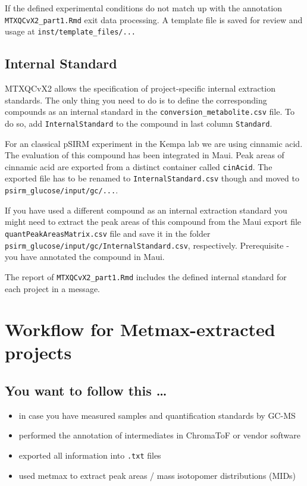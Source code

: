 \documentclass[]{book}
\providecommand{\tightlist}{%
  \setlength{\itemsep}{0pt}\setlength{\parskip}{0pt}}
\theoremstyle{definition}
\theoremstyle{definition}
\theoremstyle{definition}
\theoremstyle{remark}
\begin{document}
If the defined experimental conditions do not match up with the
annotation \texttt{MTXQCvX2\_part1.Rmd} exit data processing. A template
file is saved for review and usage at \texttt{inst/template\_files/...}

\section{Internal Standard}\label{internal-standard}

MTXQCvX2 allows the specification of project-specific internal
extraction standards. The only thing you need to do is to define the
corresponding compounds as an internal standard in the
\texttt{conversion\_metabolite.csv} file. To do so, add
\texttt{InternalStandard} to the compound in last column
\texttt{Standard}.

For an classical pSIRM experiment in the Kempa lab we are using cinnamic
acid. The evaluation of this compound has been integrated in Maui. Peak
areas of cinnamic acid are exported from a distinct container called
\texttt{cinAcid}. The exported file has to be renamed to
\texttt{InternalStandard.csv} though and moved to
\texttt{psirm\_glucose/input/gc/...}.

If you have used a different compound as an internal extraction standard
you might need to extract the peak areas of this compound from the Maui
export file \texttt{quantPeakAreasMatrix.csv} file and save it in the
folder \texttt{psirm\_glucose/input/gc/InternalStandard.csv},
respectively. Prerequisite - you have annotated the compound in Maui.

The report of \texttt{MTXQCvX2\_part1.Rmd} includes the defined internal
standard for each project in a message.

\chapter{Workflow for Metmax-extracted projects}\label{metmax}

\section{You want to follow this
\ldots{}}\label{you-want-to-follow-this}

\begin{itemize}
\tightlist
\item
  in case you have measured samples and quantification standards by
  GC-MS
\item
  performed the annotation of intermediates in ChromaToF or vendor
  software
\item
  exported all information into \texttt{.txt} files
\item
  used metmax to extract peak areas / mass isotopomer distributions
  (MIDs)
\end{itemize}
\end{document}
